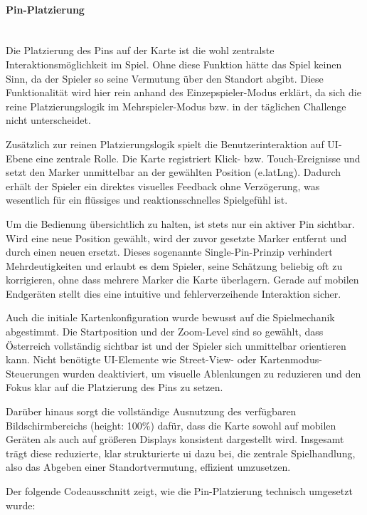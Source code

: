 \paragraph{Pin-Platzierung}
\mbox{}\\
Die Platzierung des Pins auf der Karte ist die wohl zentralste Interaktionsmöglichkeit im Spiel. Ohne diese Funktion hätte das Spiel keinen
Sinn, da der Spieler so seine Vermutung über den Standort abgibt. Diese Funktionalität wird hier rein anhand des Einzepspieler-Modus erklärt,
da sich die reine Platzierungslogik im Mehrspieler-Modus bzw. in der täglichen Challenge nicht unterscheidet.

Zusätzlich zur reinen Platzierungslogik spielt die Benutzerinteraktion auf UI-Ebene eine zentrale Rolle. Die Karte registriert Klick- bzw. Touch-Ereignisse und setzt den Marker unmittelbar an der gewählten Position (e.latLng). Dadurch erhält der Spieler ein direktes visuelles Feedback ohne Verzögerung, was wesentlich für ein flüssiges und reaktionsschnelles Spielgefühl ist.

Um die Bedienung übersichtlich zu halten, ist stets nur ein aktiver Pin sichtbar. Wird eine neue Position gewählt, wird der zuvor gesetzte Marker entfernt und durch einen neuen ersetzt. Dieses sogenannte Single-Pin-Prinzip verhindert Mehrdeutigkeiten und erlaubt es dem Spieler, seine Schätzung beliebig oft zu korrigieren, ohne dass mehrere Marker die Karte überlagern. Gerade auf mobilen Endgeräten stellt dies eine intuitive und fehlerverzeihende Interaktion sicher.

Auch die initiale Kartenkonfiguration wurde bewusst auf die Spielmechanik abgestimmt. Die Startposition und der Zoom-Level sind so gewählt, dass Österreich vollständig sichtbar ist und der Spieler sich unmittelbar orientieren kann. Nicht benötigte UI-Elemente wie Street-View- oder Kartenmodus-Steuerungen wurden deaktiviert, um visuelle Ablenkungen zu reduzieren und den Fokus klar auf die Platzierung des Pins zu setzen.

Darüber hinaus sorgt die vollständige Ausnutzung des verfügbaren Bildschirmbereichs (height: 100\%) dafür, dass die Karte sowohl auf mobilen Geräten als auch auf größeren Displays konsistent dargestellt wird. Insgesamt trägt diese reduzierte, klar strukturierte \gls{ui} dazu bei, die zentrale Spielhandlung, also das Abgeben einer Standortvermutung, effizient umzusetzen.

Der folgende Codeausschnitt zeigt, wie die Pin-Platzierung technisch umgesetzt wurde:


